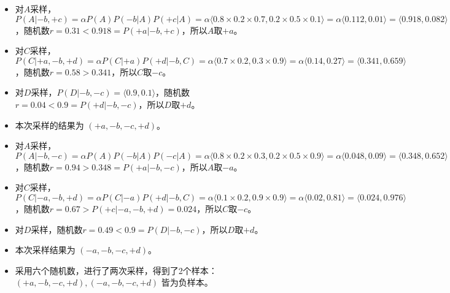 \begin{enumerate}
\begin{solution}
\begin{itemize}
            \item 对$A$采样，$P(A| -b,+c)=\alpha P(A)P(-b|A)P(+c|A)=\alpha\langle 0.8\times 0.2\times 0.7, 0.2\times 0.5\times 0.1 \rangle=\alpha\langle 0.112, 0.01\rangle=\langle 0.918,0.082\rangle$，随机数$r=0.31<0.918=P(+a|-b,+c)$，所以$A$取$+a$。
            \item 对$C$采样，$P(C| +a,-b,+d)=\alpha P(C|+a)P(+d|-b,C)=\alpha\langle 0.7\times 0.2, 0.3\times 0.9 \rangle=\alpha\langle 0.14,0.27 \rangle=\langle 0.341,0.659\rangle$，随机数$r=0.58>0.341$，所以$C$取$-c$。
            \item 对$D$采样，$P(D| -b,-c)=\langle 0.9,0.1 \rangle$，随机数 $r=0.04<0.9=P(+d|-b,-c)$，所以$D$取$+d$。
            \item 本次采样的结果为 $(+a,-b,-c,+d)$。
            \item 对$A$采样，$P(A| -b,-c)=\alpha P(A)P(-b|A)P(-c|A)=\alpha\langle 0.8\times 0.2\times 0.3, 0.2\times 0.5\times 0.9 \rangle=\alpha\langle 0.048,0.09\rangle=\langle 0.348,0.652\rangle$，随机数$r=0.94>0.348=P(+a|-b,-c)$，所以$A$取$-a$。
            \item 对$C$采样，$P(C| -a,-b,+d)=\alpha P(C|-a)P(+d|-b,C)=\alpha\langle 0.1\times 0.2, 0.9\times 0.9\rangle=\alpha\langle 0.02,0.81 \rangle=\langle 0.024,0.976 \rangle$，随机数$r=0.67>P(+c|-a,-b,+d)=0.024$，所以$C$取$-c$。
            \item 对$D$采样，随机数$r=0.49<0.9=P(D|-b,-c)$，所以$D$取$+d$。
            \item 本次采样结果为 $(-a,-b,-c,+d)$。
            \item 采用六个随机数，进行了两次采样，得到了2个样本：$(+a,-b,-c,+d), (-a, -b, -c, +d)$ 皆为负样本。
        \end{itemize}
    \end{solution}
\end{enumerate}

